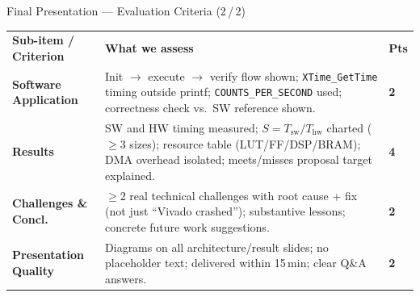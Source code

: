 \documentclass[10pt,aspectratio=169]{beamer}
\begin{document}
\begin{frame}{Final Presentation --- Evaluation Criteria (2\,/\,2)}
\setlength{\extrarowheight}{2pt}\setlength{\tabcolsep}{4pt}
\begin{tabular}{m{3.8cm}m{8.8cm}>{\raggedleft\arraybackslash}m{1.4cm}}
\rowcolor{CF}
\textbf{\color{white}Sub-item / Criterion} &
\textbf{\color{white}What we assess} &
\textbf{\color{white}Pts} \tabularnewline
\textbf{Software Application} &
  {\color{TxtMd}Init $\to$ execute $\to$ verify flow shown; \texttt{XTime\_GetTime} timing outside printf; \texttt{COUNTS\_PER\_SECOND} used; correctness check vs.\ SW reference shown.} &
  \textbf{\color{CF}2} \tabularnewline
\textbf{Results} &
  {\color{TxtMd}SW and HW timing measured; $S=T_{\mathrm{sw}}/T_{\mathrm{hw}}$ charted ($\geq$3 sizes); resource table (LUT/FF/DSP/BRAM); DMA overhead isolated; meets/misses proposal target explained.} &
  \textbf{\color{CF}4} \tabularnewline
\textbf{Challenges \& Concl.} &
  {\color{TxtMd}$\geq$2 real technical challenges with root cause + fix (not just ``Vivado crashed''); substantive lessons; concrete future work suggestions.} &
  \textbf{\color{CF}2} \tabularnewline
\textbf{Presentation Quality} &
  {\color{TxtMd}Diagrams on all architecture/result slides; no placeholder text; delivered within 15\,min; clear Q\&A answers.} &
  \textbf{\color{CF}2} \tabularnewline
\end{tabular}
\end{frame}
\end{document}
